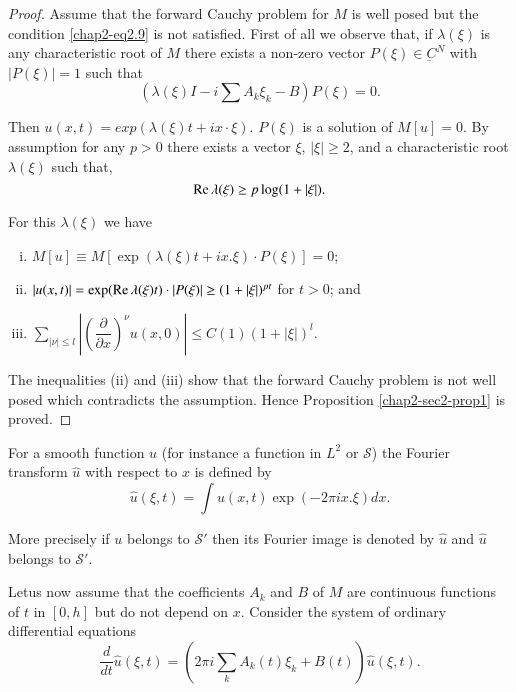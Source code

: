 \begin{proof}
Assume that the forward Cauchy problem for $M$ is well posed but the
condition \eqref{chap2-eq2.9} is not satisfied. First of all we observe that, if
$\lambda (\xi)$ is any characteristic root of $M$  there exists a
non-zero vector $P (\xi) \in \underbar{C}^N$ with $|P(\xi)|= 1$
such that  
$$
\left( \lambda (\xi) I - i \sum A_k \xi_k - B\right) P (\xi ) = 0.  
$$

Then $u(x,  t) = exp (\lambda (\xi ) t + ix \cdot \xi )$. $P (\xi)$ is a 
solution of $M [ u ] = 0$. By assumption for any $p  > 0$ there
exists a vector $\xi$, $| \xi | \geq 2$,  and a characteristic root
$\lambda (\xi)$ such that,   
$$
\operatorname{Re}  \lambda (\xi) \geq p \log (1+ | \xi |). 
$$

For this $ \lambda (\xi )$ we have 
\begin{enumerate}[(i)]
\item $M [ u ] \equiv M [ \exp (\lambda (\xi) t + ix. \xi 
  )\cdot P (\xi ) ] = 0$; 

\item $| u (x,  t) | = \exp (\operatorname{Re} \lambda (\xi) t)\cdot |P (\xi) | \geq ( 1 
  + | \xi | )^{pt}$ for $t > 0$; and  

\item $\sum_{| \nu | \leq l} | \left(\dfrac{\partial}{\partial
  x}\right)^\nu u (x, 0) | \leq C (1) (1+ |\xi | )^l$. 
\end{enumerate}

The inequalities (ii) and (iii) show that the forward Cauchy problem
is not well posed which contradicts the assumption. Hence Proposition
\ref{chap2-sec2-prop1}  is proved.  
\end{proof}

For a smooth function $u$ (for instance a function in $L^2$ or
$\mathscr{S}$) 
the Fourier transform $ \widehat{u}$ with respect to $x$ is defined by    
\begin{equation}
\widehat{u} (\xi ,  t) = \int u(x, t) \exp (-2 \pi ix. \xi )
dx. \tag{2.10}\label{chap2-eq2.10}   
\end{equation}

More precisely if $ u$ belongs to $\mathscr{S}'$ then its Fourier
image is
denoted by $\widehat{u}$ and $\widehat{u}$ belongs to $\mathscr{S}'$. 

Let\pageoriginale us now assume that the coefficients $A_k$ and $B$ of
$M$ are continuous functions of $t$ in $[0,  h] $ but do not depend on 
$x$. Consider the system of ordinary differential equations  
\begin{equation}
\frac{d}{dt} \widehat{u} (\xi ,  t) = \left(2 \pi i \sum_{k} A_k (t) \xi_k
+ B(t) \right) \widehat{u} (\xi,  t). \tag{2.11}\label{chap2-eq2.11}   
\end{equation}

